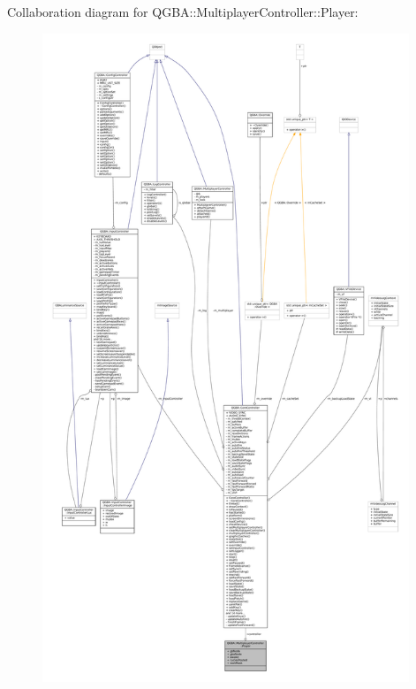 Collaboration diagram for Q\+G\+BA\+:\+:Multiplayer\+Controller\+:\+:Player\+:
\nopagebreak
\begin{figure}[H]
\begin{center}
\leavevmode
\includegraphics[height=550pt]{struct_q_g_b_a_1_1_multiplayer_controller_1_1_player__coll__graph}
\end{center}
\end{figure}
